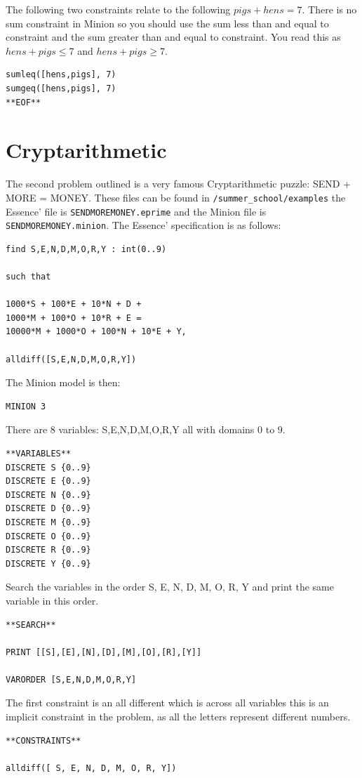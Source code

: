 \documentclass[oneside]{book}
\begin{document}
The following two constraints relate to the following $pigs + hens = 7$. There is no sum constraint in Minion so you should use the sum less than and equal to constraint and the sum greater than and equal to constraint. You read this as $hens + pigs \leq 7$ and $hens + pigs \geq 7$.
\begin{verbatim}
sumleq([hens,pigs], 7)
sumgeq([hens,pigs], 7)
**EOF**
\end{verbatim}

\section{Cryptarithmetic}
The second problem outlined is a very famous Cryptarithmetic puzzle: SEND + MORE = MONEY. These files can be found in \texttt{/summer\_school/examples} the Essence' file is \texttt{SENDMOREMONEY.eprime} and the Minion file is \texttt{SENDMOREMONEY.minion}. The Essence' specification is as follows:

\begin{verbatim}
find S,E,N,D,M,O,R,Y : int(0..9)

such that

1000*S + 100*E + 10*N + D + 
1000*M + 100*O + 10*R + E =
10000*M + 1000*O + 100*N + 10*E + Y,

alldiff([S,E,N,D,M,O,R,Y])
\end{verbatim}

The Minion model is then:

\begin{verbatim}
MINION 3
\end{verbatim}

There are 8 variables: S,E,N,D,M,O,R,Y all with domains 0 to 9.
\begin{verbatim}
**VARIABLES**
DISCRETE S {0..9}
DISCRETE E {0..9}
DISCRETE N {0..9}
DISCRETE D {0..9}
DISCRETE M {0..9}
DISCRETE O {0..9}
DISCRETE R {0..9}
DISCRETE Y {0..9}
\end{verbatim}

Search the variables in the order S, E, N, D, M, O, R, Y and print the same variable in this order.
\begin{verbatim}
**SEARCH**

PRINT [[S],[E],[N],[D],[M],[O],[R],[Y]]

VARORDER [S,E,N,D,M,O,R,Y]
\end{verbatim}

The first constraint is an all different which is across all variables this is an implicit constraint in the problem, as all the letters represent different numbers.
\begin{verbatim}
**CONSTRAINTS**

alldiff([ S, E, N, D, M, O, R, Y])
\end{verbatim}
\end{document}
